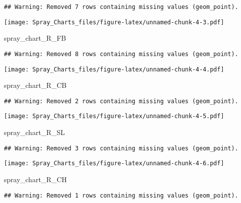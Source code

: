 \documentclass[]{article}
\newenvironment{Shaded}{\begin{snugshade}}{\end{snugshade}}
\newcommand{\NormalTok}[1]{#1}
\begin{document}
\begin{verbatim}
## Warning: Removed 7 rows containing missing values (geom_point).
\end{verbatim}

\texttt{[image: Spray\_Charts\_files/figure-latex/unnamed-chunk-4-3.pdf]}

\begin{Shaded}
\begin{Highlighting}[]
\NormalTok{spray_chart_R_FB}
\end{Highlighting}
\end{Shaded}

\begin{verbatim}
## Warning: Removed 8 rows containing missing values (geom_point).
\end{verbatim}

\texttt{[image: Spray\_Charts\_files/figure-latex/unnamed-chunk-4-4.pdf]}

\begin{Shaded}
\begin{Highlighting}[]
\NormalTok{spray_chart_R_CB}
\end{Highlighting}
\end{Shaded}

\begin{verbatim}
## Warning: Removed 2 rows containing missing values (geom_point).
\end{verbatim}

\texttt{[image: Spray\_Charts\_files/figure-latex/unnamed-chunk-4-5.pdf]}

\begin{Shaded}
\begin{Highlighting}[]
\NormalTok{spray_chart_R_SL}
\end{Highlighting}
\end{Shaded}

\begin{verbatim}
## Warning: Removed 3 rows containing missing values (geom_point).
\end{verbatim}

\texttt{[image: Spray\_Charts\_files/figure-latex/unnamed-chunk-4-6.pdf]}

\begin{Shaded}
\begin{Highlighting}[]
\NormalTok{spray_chart_R_CH}
\end{Highlighting}
\end{Shaded}

\begin{verbatim}
## Warning: Removed 1 rows containing missing values (geom_point).
\end{verbatim}
\end{document}
